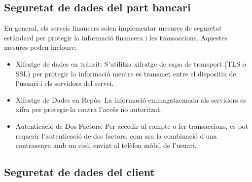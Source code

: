 



\subsection*{Seguretat de dades del part bancari}


En general, els serveis financers solen implementar mesures de seguretat estàndard per protegir la informació financera i les transaccions. Aquestes mesures poden incloure:

\begin{itemize}
    \item Xifratge de dades en trànsit: S'utilitza xifratge de capa de transport (TLS o SSL) per protegir la informació mentre es transmet entre el dispositiu de l'usuari i els servidors del servei.
    \item Xifratge de Dades en Repòs: La informació emmagatzemada als servidors es xifra per protegir-la contra l'accés no autoritzat.
    \item Autenticació de Dos Factors: Per accedir al compte o fer transaccions, es pot requerir l'autenticació de dos factors, com ara la combinació d'una contrasenya amb un codi enviat al telèfon mòbil de l'usuari.
\end{itemize}

\subsection*{Seguretat de dades del client}


